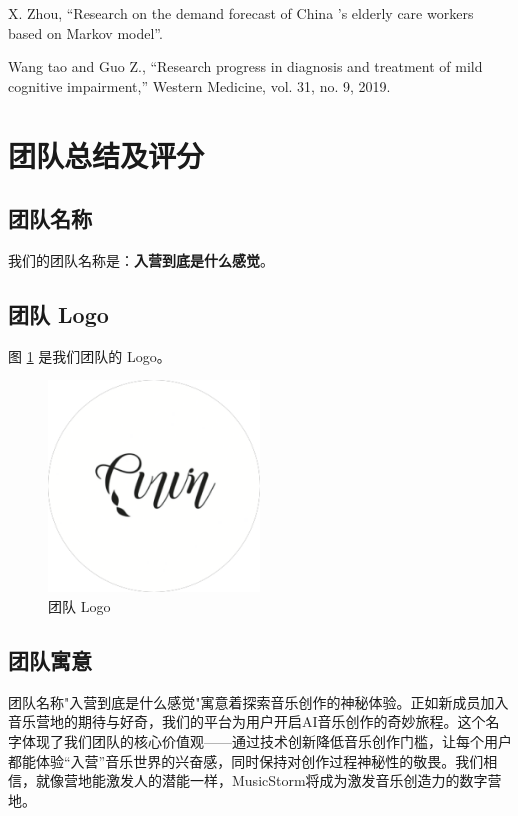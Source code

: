 \documentclass{base}
\numberwithin{figure}{section} %
\begin{document}
\noindent[13] X. Zhou, “Research on the demand forecast of China ’s elderly care workers based on Markov model”.

\noindent[14] Wang  tao and Guo Z., “Research progress in diagnosis and treatment of mild cognitive impairment,” Western Medicine, vol. 31, no. 9, 2019.

\newpage
\section{团队总结及评分}

\subsection{团队名称}

我们的团队名称是：\textbf{入营到底是什么感觉}。

\subsection{团队 Logo}

图 \ref{fig:team-logo} 是我们团队的 Logo。

\begin{figure}[H]
    \centering
    \includegraphics[width=0.5\textwidth]{images/9-1.png}
    \caption{团队 Logo}
    \label{fig:team-logo}
\end{figure}

\subsection{团队寓意}

团队名称"入营到底是什么感觉"寓意着探索音乐创作的神秘体验。正如新成员加入音乐营地的期待与好奇，我们的平台为用户开启AI音乐创作的奇妙旅程。这个名字体现了我们团队的核心价值观——通过技术创新降低音乐创作门槛，让每个用户都能体验“入营”音乐世界的兴奋感，同时保持对创作过程神秘性的敬畏。我们相信，就像营地能激发人的潜能一样，MusicStorm将成为激发音乐创造力的数字营地。
\end{document}
